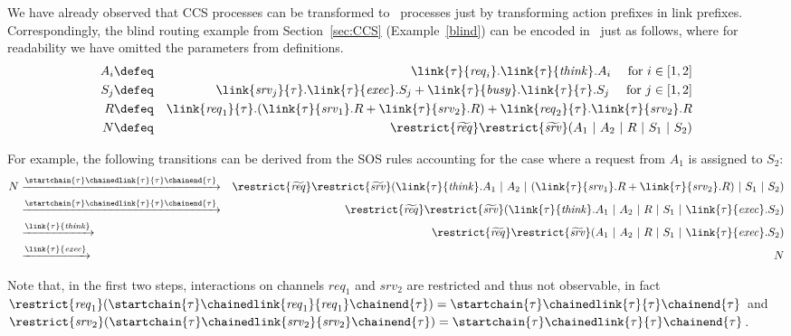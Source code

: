 \begin{example}
We have already observed that CCS processes can be transformed to \CNA\ processes just by transforming action prefixes in link prefixes. Correspondingly, the blind routing example from Section~\ref{sec:CCS} (Example~\ref{blind}) can be encoded in \CNA\ just as follows, where for readability we have omitted the parameters from definitions.
%
\begin{eqnarray*}
A_i & \defeq & \link{\tau}{\mathit{req}_i}.\link{\tau}{\mathit{think}}.A_i\quad \mbox{ for $i\in[1,2]$} \\
S_j & \defeq & \link{\mathit{srv}_j}{\tau}.\link{\tau}{\mathit{exec}}.S_j + \link{\tau}{\mathit{busy}}.\link{\tau}{\tau}.S_j\quad \mbox{ for $j\in[1,2]$}\\
R & \defeq & \link{\mathit{req}_1}{\tau}.(\link{\tau}{\mathit{srv}_1}.R + \link{\tau}{\mathit{srv}_2}.R) + \link{\mathit{req}_2}{\tau}.\link{\tau}{\mathit{srv}_2}.R \\
N & \defeq &
\restrict{\widetilde{\mathit{req}}} 
\restrict{\widetilde{\mathit{srv}}}
(A_1\ |\ A_2\ |\ R\ |\ S_1\ |\ S_2)
\end{eqnarray*}

For example, the following transitions can be derived from the SOS rules accounting for the case where a request from $A_1$ is assigned to $S_2$:
\begin{eqnarray*}
N
& \xrightarrow{ \startchain{\tau}\chainedlink{\tau}{\tau}\chainend{\tau} } &
\restrict{\widetilde{\mathit{req}}} 
\restrict{\widetilde{\mathit{srv}}}
(\link{\tau}{\mathit{think}}.A_1\ |\ A_2\ |\ (\link{\tau}{\mathit{srv}_1}.R + \link{\tau}{\mathit{srv}_2}.R)\ |\ S_1\ |\ S_2)
\\
& \xrightarrow{ \startchain{\tau}\chainedlink{\tau}{\tau}\chainend{\tau} } &
\restrict{\widetilde{\mathit{req}}} 
\restrict{\widetilde{\mathit{srv}}}
(\link{\tau}{\mathit{think}}.A_1\ |\ A_2\ |\ R\ |\ S_1\ |\ \link{\tau}{\mathit{exec}}.S_2)
\\
& \xrightarrow{ \link{\tau}{\mathit{think}} } &
\restrict{\widetilde{\mathit{req}}} 
\restrict{\widetilde{\mathit{srv}}}
(A_1\ |\ A_2\ |\ R\ |\ S_1\ |\ \link{\tau}{\mathit{exec}}.S_2)
\\
& \xrightarrow{ \link{\tau}{\mathit{exec}} } &
N
\end{eqnarray*}

Note that, in the first two steps, interactions on channels $\mathit{req}_1$ and $\mathit{srv}_2$ are restricted and thus not observable, in fact $\restrict{\mathit{req}_1}(\startchain{\tau}\chainedlink{\mathit{req}_1}{\mathit{req}_1}\chainend{\tau}) = \startchain{\tau}\chainedlink{\tau}{\tau}\chainend{\tau}$ and $\restrict{\mathit{srv}_2}(\startchain{\tau}\chainedlink{\mathit{srv}_2}{\mathit{srv}_2}\chainend{\tau}) = \startchain{\tau}\chainedlink{\tau}{\tau}\chainend{\tau}$.

\end{example}

